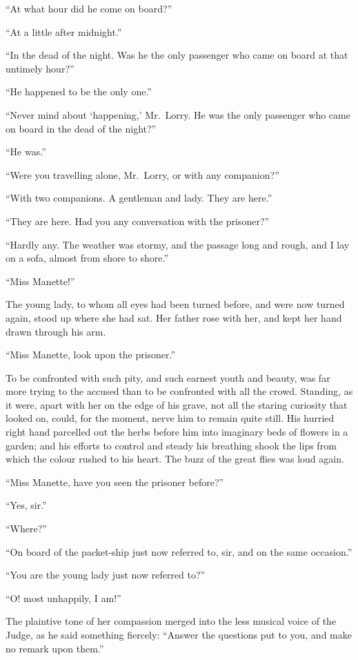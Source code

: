 ``At what hour did he come on board?''

``At a little after midnight.''

``In the dead of the night.  Was he the only passenger who came on
board at that untimely hour?''

``He happened to be the only one.''

``Never mind about `happening,' Mr.\ Lorry.  He was the only passenger
who came on board in the dead of the night?''

``He was.''

``Were you travelling alone, Mr.\ Lorry, or with any companion?''

``With two companions.  A gentleman and lady.  They are here.''

``They are here.  Had you any conversation with the prisoner?''

``Hardly any.  The weather was stormy, and the passage long and rough,
and I lay on a sofa, almost from shore to shore.''

``Miss Manette!''

The young lady, to whom all eyes had been turned before, and were now
turned again, stood up where she had sat.  Her father rose with her,
and kept her hand drawn through his arm.

``Miss Manette, look upon the prisoner.''

To be confronted with such pity, and such earnest youth and beauty,
was far more trying to the accused than to be confronted with all the
crowd.  Standing, as it were, apart with her on the edge of his grave,
not all the staring curiosity that looked on, could, for the moment,
nerve him to remain quite still.  His hurried right hand parcelled
out the herbs before him into imaginary beds of flowers in a garden;
and his efforts to control and steady his breathing shook the lips
from which the colour rushed to his heart.  The buzz of the great
flies was loud again.

``Miss Manette, have you seen the prisoner before?''

``Yes, sir.''

``Where?''

``On board of the packet-ship just now referred to, sir, and on the
same occasion.''

``You are the young lady just now referred to?''

``O! most unhappily, I am!''

The plaintive tone of her compassion merged into the less musical
voice of the Judge, as he said something fiercely:
``Answer the questions put to you, and make no remark upon them.''

